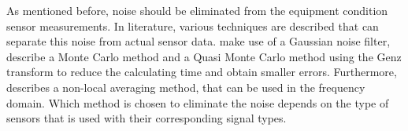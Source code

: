 As mentioned before, noise should be eliminated from the equipment condition sensor measurements. In literature, various techniques are described that can separate this noise from actual sensor data. \citet{LESON2016} make use of a Gaussian noise filter, \citet{KALLEN2005} describe a Monte Carlo method and \citet{LU2013} a Quasi Monte Carlo method using the Genz transform to reduce the calculating time and obtain smaller errors. Furthermore, \citet{Bourdin2011} describes a non-local averaging method, that can be used in the frequency domain. Which method is chosen to eliminate the noise depends on the type of sensors that is used with their corresponding signal types.

